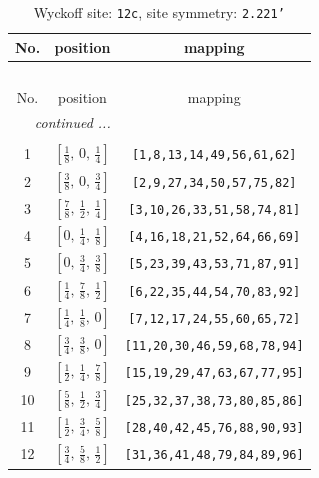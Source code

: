 \documentclass[fleqn,8pt]{jsarticle}
\begin{document}
\begin{longtable}{ccc}
\caption{Wyckoff site: {\tt 12c}, site symmetry: {\tt 2.221'}}
 \\
 \hline \hline
No. & position & mapping \\ \hline \endfirsthead

\multicolumn{2}{l}{\tablename\ \thetable{}} \\
 \hline \hline
No. & position & mapping \\ \hline \endhead

 \hline \hline
\multicolumn{2}{r}{\footnotesize\it continued ...} \\ \endfoot

 \hline \hline
\multicolumn{2}{r}{} \\ \endlastfoot

1 & $\left[ \frac{1}{8},\, 0,\, \frac{1}{4} \right]$ & {\tt [1,8,13,14,49,56,61,62]} \\ \hline
2 & $\left[ \frac{3}{8},\, 0,\, \frac{3}{4} \right]$ & {\tt [2,9,27,34,50,57,75,82]} \\ \hline
3 & $\left[ \frac{7}{8},\, \frac{1}{2},\, \frac{1}{4} \right]$ & {\tt [3,10,26,33,51,58,74,81]} \\ \hline
4 & $\left[ 0,\, \frac{1}{4},\, \frac{1}{8} \right]$ & {\tt [4,16,18,21,52,64,66,69]} \\ \hline
5 & $\left[ 0,\, \frac{3}{4},\, \frac{3}{8} \right]$ & {\tt [5,23,39,43,53,71,87,91]} \\ \hline
6 & $\left[ \frac{1}{4},\, \frac{7}{8},\, \frac{1}{2} \right]$ & {\tt [6,22,35,44,54,70,83,92]} \\ \hline
7 & $\left[ \frac{1}{4},\, \frac{1}{8},\, 0 \right]$ & {\tt [7,12,17,24,55,60,65,72]} \\ \hline
8 & $\left[ \frac{3}{4},\, \frac{3}{8},\, 0 \right]$ & {\tt [11,20,30,46,59,68,78,94]} \\ \hline
9 & $\left[ \frac{1}{2},\, \frac{1}{4},\, \frac{7}{8} \right]$ & {\tt [15,19,29,47,63,67,77,95]} \\ \hline
10 & $\left[ \frac{5}{8},\, \frac{1}{2},\, \frac{3}{4} \right]$ & {\tt [25,32,37,38,73,80,85,86]} \\ \hline
11 & $\left[ \frac{1}{2},\, \frac{3}{4},\, \frac{5}{8} \right]$ & {\tt [28,40,42,45,76,88,90,93]} \\ \hline
12 & $\left[ \frac{3}{4},\, \frac{5}{8},\, \frac{1}{2} \right]$ & {\tt [31,36,41,48,79,84,89,96]} \\
\end{longtable}
\renewcommand{\arraystretch}{1.2}
\end{document}
